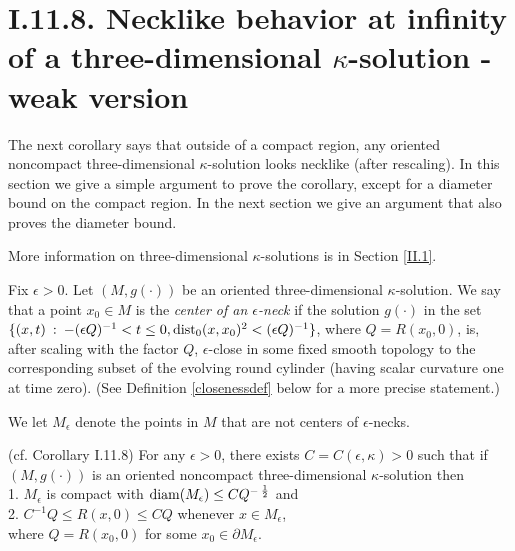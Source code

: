 \section{I.11.8. Necklike behavior at infinity of a three-dimensional
$\kappa$-solution - weak version}

The next corollary says that outside of a compact region,  any oriented noncompact
three-dimensional $\kappa$-solution looks necklike (after rescaling).
In this section we give a simple argument to prove the corollary, except for
a diameter bound on the compact region.  In the next section we give an
argument that also proves the diameter bound.

More information on three-dimensional $\kappa$-solutions is in
Section \ref{II.1}.

\begin{definition}
  \label{def:kl-necklike-behavior-at-infinity-three-dimensional-solution-weak-version-kappa-solution-definition}

Fix $\epsilon > 0$. Let $(M, g(\cdot))$ be an oriented three-dimensional $\kappa$-solution.
We say that a point $x_0 \in M$ is the {\em center of an $\epsilon$-neck} if the
solution $g(\cdot)$ in the set
$\{(x,t) \: : \: - (\epsilon Q)^{-1} < t \le 0, \operatorname{dist}_0(x, x_0)^2 < (\epsilon Q)^{-1}\}$,
where $Q = R(x_0, 0)$, is, after scaling with the factor $Q$, $\epsilon$-close
in some fixed smooth topology to the corresponding subset of the
evolving round cylinder (having scalar curvature one at time zero).
(See Definition \ref{closenessdef} below for a more precise statement.)

We let $M_\epsilon$ denote the points in $M$ that are not centers of
$\epsilon$-necks.
\end{definition}
\begin{corollary}
  \label{cor:kl-necklike-behavior-at-infinity-three-dimensional-solution-weak-version-existence-kappa-solutions}
 (cf. Corollary I.11.8) \label{corI.11.8}
For any $\epsilon > 0$, there exists $C = C(\epsilon, \kappa) > 0$ such that
if $(M, g(\cdot))$ is an oriented noncompact three-dimensional $\kappa$-solution then \\
1.  $M_\epsilon$ is compact with $\operatorname{diam}(M_\epsilon) \le C Q^{- \: \frac12}$ and \\
2. $C^{-1} Q \le R(x,0) \le CQ$ whenever $x \in M_\epsilon$, \\
where $Q = R(x_0, 0)$ for some $x_0 \in \partial M_\epsilon$.
\end{corollary}
